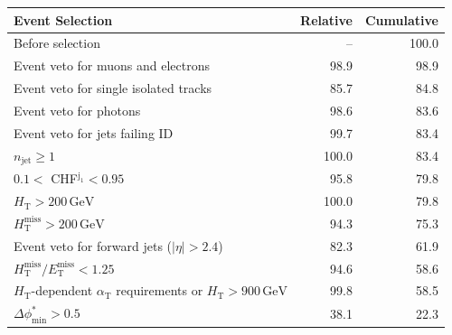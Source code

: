 \begin{table}[p]
    \begin{center}
        \begin{tabular}{lrr}
      \hline
                                                                                               Event Selection &  Relative &  Cumulative \\
      \hline
                                                                                             Before selection  &         -- &      100.0 \\
                                                                            Event veto for muons and electrons &       98.9 &       98.9 \\
                                                                         Event veto for single isolated tracks &       85.7 &       84.8 \\
                                                                                        Event veto for photons &       98.6 &       83.6 \\
                                                                                Event veto for jets failing ID &       99.7 &       83.4 \\
                                                                                     $n_{\mathrm{jet}} \geq 1$ &      100.0 &       83.4 \\
                                                                           $0.1 <$ CHF$^{\mathrm{j_1}} < 0.95$ &       95.8 &       79.8 \\
                                                                          $H_{\mathrm{T}} > 200\,\mathrm{GeV}$ &      100.0 &       79.8 \\
                                                          $H_{\mathrm{T}}^{\mathrm{miss}} > 200\,\mathrm{GeV}$ &       94.3 &       75.3 \\
                                                                  Event veto for forward jets ($|\eta| > 2.4$) &       82.3 &       61.9 \\
                                      $H_{\mathrm{T}}^{\mathrm{miss}} / E_{\mathrm{T}}^{\mathrm{miss}} < 1.25$ &       94.6 &       58.6 \\
         $H_{\mathrm{T}}$-dependent $\alpha_{\mathrm{T}}$ requirements or $H_{\mathrm{T}} > 900\,\mathrm{GeV}$ &       99.8 &       58.5 \\
                                                                         $\Delta\phi^{*}_{\mathrm{min}} > 0.5$ &       38.1 &       22.3 \\

\end{tabular}
\end{center}
\end{table}
